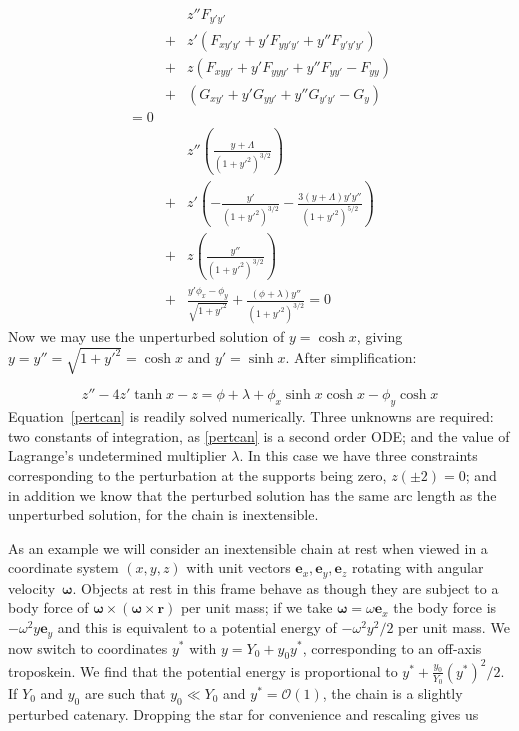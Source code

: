 \documentclass[pdflatex,sn-mathphys-num]{sn-jnl}%
\theoremstyle{thmstyleone}%
\theoremstyle{thmstyletwo}%
\theoremstyle{thmstylethree}%
\begin{document}
\begin{eqnarray}
&{}& z''F_{y'y'}\nonumber\\
&+& z'(F_{xy'y'} + y'F_{yy'y'} + y''F_{y'y'y'})\nonumber\\
&+& z (F_{xyy'} + y'F_{yyy'} + y''F_{yy'}-F_{yy})\nonumber\\
&+& (G_{xy'} + y'G_{yy'} + y''G_{y'y'}- G_{y})\nonumber\\
= 0\\
&{}&  z''\left(\frac{y+\Lambda}{(1+y'^2)^{3/2}}\right)\nonumber\\
&+& z' \left(-\frac{y'}{(1+y'^2)^{3/2}} -\frac{3(y+\Lambda)y'y''}{(1+y'^2)^{5/2}}\right)\nonumber\\
&+& z  \left(\frac{y''}{(1+y'^2)^{3/2}}\right)\nonumber\\
&+& \frac{y'\phi_x-\phi_y}{\sqrt{1+y'^2}} + \frac{(\phi+\lambda)y''}{(1+y'^2)^{3/2}}=0
\end{eqnarray}
%
Now we may use the unperturbed solution of $y=\cosh x$, giving
$y=y''=\sqrt{1+y'^2}=\cosh x$ and $y'=\sinh x$.  After simplification:

\begin{equation}\label{pertcan}
  z'' - 4z'\tanh x - z =
  \phi + \lambda + \phi_x\sinh x\cosh x - \phi_y\cosh x
\end{equation}
%
Equation~\ref{pertcan} is readily solved numerically.  Three unknowns
are required: two constants of integration, as \ref{pertcan} is a
second order ODE; and the value of Lagrange's undetermined multiplier
$\lambda$.  In this case we have three constraints corresponding to
the perturbation at the supports being zero, $z(\pm 2)=0$; and in
addition we know that the perturbed solution has the same arc length
as the unperturbed solution, for the chain is inextensible.

As an example we will consider an inextensible chain at rest when
viewed in a coordinate system $(x,y,z)$ with unit vectors
$\boldsymbol{e}_x,\boldsymbol{e}_y,\boldsymbol{e}_z$ rotating with
angular velocity~$\boldsymbol{\omega}$.  Objects at rest in this frame
behave as though they are subject to a body force of
$\boldsymbol{\omega}\times\left(\boldsymbol{\omega}\times\boldsymbol{r}\right)$
per unit mass; if we take $\boldsymbol{\omega}=\omega\boldsymbol{e}_x$
the body force is $-\omega^2y\boldsymbol{e}_y$ and this is equivalent
to a potential energy of $-\omega^2y^2/2$ per unit mass.  We now
switch to coordinates $y^*$ with $y = Y_0 + y_0y^*$, corresponding to
an off-axis troposkein.  We find that the potential energy is
proportional to $y^* +
\frac{y_0}{Y_0}\left(y^*\right)^2/2$.  If
$Y_0$ and $y_0$ are such that $y_0\ll Y_0$ and $y^*={\mathcal O}(1)$,
the chain is a slightly perturbed catenary.  Dropping the star for
convenience and rescaling gives us
\end{document}
